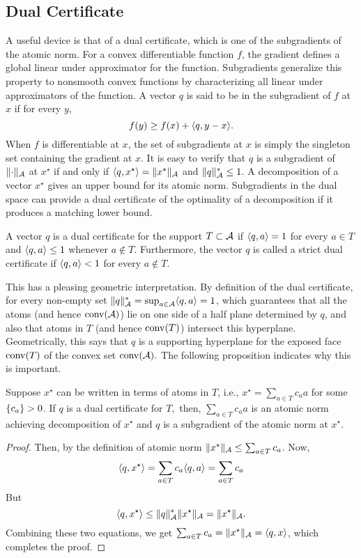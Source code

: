 \subsection{Dual Certificate}

A useful device is that of a dual certificate, which is one of the subgradients
of the atomic norm. For a convex differentiable function $f$, the gradient
defines a global linear under approximator for the function. Subgradients
generalize this property to nonsmooth convex functions by characterizing all
linear under approximators of the function. A vector $q$ is said to be in the subgradient of $f$ at $x$ if for every $y,$
\[
	f(y) \geq f(x) + \langle q, y-x\rangle.
\]
When $f$ is differentiable at $x$, the set of subgradients at $x$ is simply the
singleton set containing the gradient at $x$. It is easy to verify that $q$ is a
subgradient of $\lVert\cdot\rVert_{\mathcal{A}} $ at $x^\star$ if and only if $\langle q,
x^\star \rangle = \lVert x^\star\rVert_{\mathcal{A}}$ and $\lVert q\rVert_{\mathcal{A}}^* \leq 1.$ A
decomposition of a vector $x^\star$ gives an upper bound for its atomic norm.
Subgradients in the dual space can provide a dual certificate of the optimality
of a decomposition if it produces a matching lower bound.

\begin{definition}\label{def:dual-certificate}
A vector $q$ is a dual certificate for the support $T \subset \mathcal{A}$ if 
$\langle q, a\rangle = 1$ for every $a \in T$ and $\langle q, a\rangle \leq 1$ whenever $a \not\in T$. Furthermore, the vector $q$ is called a strict dual certificate if $\langle q, a\rangle < 1$ for every $a \not\in T.$
\end{definition}

This has a pleasing geometric interpretation. By definition of the dual
certificate, for every non-empty set $\lVert q\rVert_{\mathcal{A}}^* = \sup_{a \in \mathcal{A}}
\langle q, a\rangle = 1$, which guarantees that all the atoms (and hence $\operatorname{conv}(\mathcal{A})$)
lie on one side of a half plane determined by $q$, and also that atoms in $T$
(and hence $\operatorname{conv}(T)$) intersect this hyperplane. Geometrically, this says that
$q$ is a supporting hyperplane for the exposed face $\operatorname{conv}(T)$ of the convex set
$\operatorname{conv}(\mathcal{A}).$ The following proposition indicates why this is important.

\begin{prop}
\label{prop:dual-certificate-is-subgrad}
Suppose $x^\star$ can be written in terms of atoms in $T$, i.e., $x^\star =
\sum_{a \in T} c_a a$ for some $\left\{ c_a \right\} > 0$. If $q$ is a dual certificate for
$T,$ then, $\sum_{a \in T} c_a a$ is an atomic norm achieving decomposition of
$x^\star$ and $q$ is a subgradient of the atomic norm at $x^\star.$
\end{prop}
\begin{proof}
	Then, by the definition of atomic norm $\lVert x^\star\rVert_{\mathcal{A}} \leq \sum_{a \in T} c_a$. Now, 
	\[
		\langle q, x^\star\rangle = \sum_{a \in T} c_a\langle q, a\rangle = \sum_{a \in T} c_a
	\]
	But 
	\[
		\langle q, x^\star\rangle \leq \lVert q\rVert_{\mathcal{A}}^* \lVert x^\star\rVert_{\mathcal{A}} = \lVert x^\star\rVert_{\mathcal{A}}.
	\]
	Combining these two equations, we get $\sum_{a \in T} c_a = \lVert x^\star\rVert_{\mathcal{A}} =
	\langle q, x\rangle$, which completes the proof.
\end{proof}

